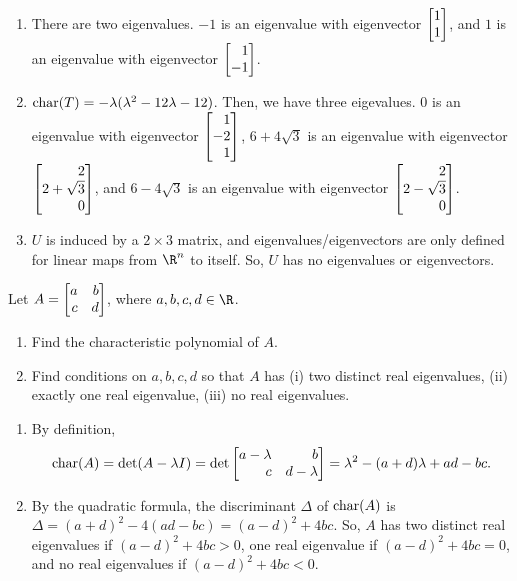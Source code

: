 \begin{exercises}
\begin{problist}
\begin{solution}
\begin{enumerate}
				\item There are two eigenvalues. $-1$ is an eigenvalue with
					eigenvector $\mat{1\\1}$, and $1$ is an eigenvalue
					with eigenvector $\mat{1 \\ -1}$.

				\item $\operatorname{char}(T) = - \lambda ( \lambda^{2} - 12 \lambda - 12)$.
					Then, we have three eigevalues. $0$ is an
					eigenvalue with eigenvector $\mat{1 \\ -2 \\ 1}$, $6
					+ 4 \sqrt{3}$ is an eigenvalue with eigenvector $\mat{2
					\\ 2 + \sqrt{3} \\ 0}$, and $6 - 4\sqrt{3}$ is an
					eigenvalue with eigenvector
					$\mat{2 \\ 2 - \sqrt{3} \\ 0}$.

				\item $U$ is induced by a $2 \times 3$ matrix, and eigenvalues/eigenvectors
					are only defined for linear maps from $\R^{n}$ to itself.
					So, $U$ has no eigenvalues or eigenvectors.
			\end{enumerate}
		\end{solution}

		\prob Let $A = \mat{a&b\\c&d}$, where $a,b,c,d \in \R$.
		\begin{enumerate}
			\item Find the characteristic polynomial of $A$.

			\item Find conditions on $a,b,c,d$ so that $A$ has (i) two distinct
				real eigenvalues, (ii) exactly one real eigenvalue, (iii) no
				real eigenvalues.
		\end{enumerate}


		\begin{solution}

			\begin{enumerate}
				\item By definition,
					\begin{align*}
						\Char(A) = \det (A - \lambda I) = \det \mat{a - \lambda & b \\ c & d - \lambda}= \lambda^{2} - (a + d)\lambda + ad - bc.
					\end{align*}

				\item By the quadratic formula, the discriminant $\Delta$ of
					$\operatorname{char}(A)$ is $\Delta = (a + d)^{2} - 4(ad - bc) =
					(a - d)^{2} + 4 bc$. So, $A$ has two distinct real
					eigenvalues if $(a - d)^{2} + 4bc > 0$, one real eigenvalue
					if $(a - d)^{2} + 4bc = 0$, and no real
					eigenvalues if $(a - d)^{2} + 4bc < 0.$
			\end{enumerate}
		\end{solution}


\end{problist}
\end{exercises}
